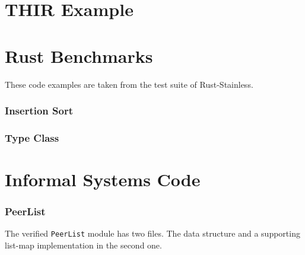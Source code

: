 \section{THIR Example}



\clearpage
\section{Rust Benchmarks}

These code examples are taken from the test suite of Rust-Stainless.

\subsubsection{Insertion Sort}

\hspace{5mm}

\subsubsection{Type Class}



\clearpage
\section{Informal Systems Code}

\subsubsection{PeerList}

The verified \lstinline!PeerList! module has two files. The data structure and
a supporting list-map implementation in the second one.




